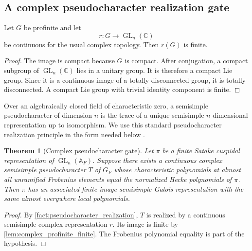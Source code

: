 \documentclass{aomart}
\newtheorem{theorem}{Theorem}[section]
\theoremstyle{definition}
\theoremstyle{remark}
\newcommand{\CC}{\mathbb C}
\newcommand{\Adele}{\mathbb A}
\newcommand{\GL}{\operatorname{GL}}
\begin{document}
\subsection{A complex pseudocharacter realization gate}

\begin{lemma}\label{lem:complex_profinite_finite}
Let \(G\) be profinite and let
\[
 r:G\longrightarrow\GL_n(\CC)
\]
be continuous for the usual complex topology. Then \(r(G)\) is finite.
\end{lemma}

\begin{proof}
The image is compact because \(G\) is compact. After conjugation, a compact subgroup of \(\GL_n(\CC)\) lies in a unitary group. It is therefore a compact Lie group. Since it is a continuous image of a totally disconnected group, it is totally disconnected. A compact Lie group with trivial identity component is finite.
\end{proof}

\begin{standardfact}\label{fact:pseudocharacter_realization}
Over an algebraically closed field of characteristic zero, a semisimple pseudocharacter of dimension \(n\) is the trace of a unique semisimple \(n\) dimensional representation up to isomorphism. We use this standard pseudocharacter realization principle in the form needed below \cite{Chenevier2014}.
\end{standardfact}

\begin{theorem}[Complex pseudocharacter gate]\label{thm:complex_pseudo_gate}
Let \(\pi\) be a finite Satake cuspidal representation of \(\GL_n(\Adele_F)\). Suppose there exists a continuous complex semisimple pseudocharacter \(T\) of \(G_F\) whose characteristic polynomials at almost all unramified Frobenius elements equal the normalized Hecke polynomials of \(\pi\). Then \(\pi\) has an associated finite image semisimple Galois representation with the same almost everywhere local polynomials.
\end{theorem}

\begin{proof}
By \cref{fact:pseudocharacter_realization}, \(T\) is realized by a continuous semisimple complex representation \(r\). Its image is finite by \cref{lem:complex_profinite_finite}. The Frobenius polynomial equality is part of the hypothesis.
\end{proof}
\end{document}
